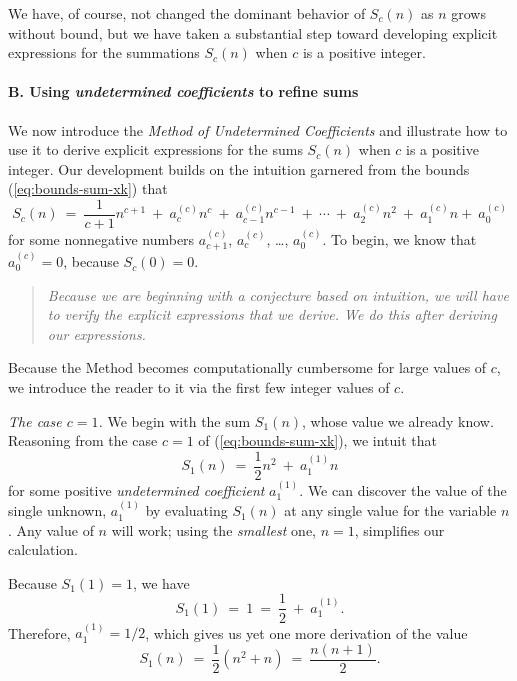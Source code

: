We have, of course, not changed the dominant behavior of $S_c(n)$ as
$n$ grows without bound, but we have taken a substantial step toward
developing explicit expressions for the summations $S_c(n)$ when $c$
is a positive integer.

\medskip

\paragraph{\small\sf B. Using {\em undetermined coefficients} to
  refine sums}

We now introduce the {\em Method of Undetermined Coefficients}
and illustrate how to use it to derive explicit expressions for the
sums $S_c(n)$ when $c$ is a positive integer.  Our development builds
on the intuition garnered from the bounds (\ref{eq:bounds-sum-xk})
that
\[ S_c(n) \ = \ \frac{1}{c+1} n^{c+1} \ + \ a^{(c)}_c n^c \ + \
a^{(c)}_{c-1} n^{c-1} \ + \ \cdots \ + \ a^{(c)}_2 n^2 \ + \ a^{(c)}_1 n
 + \ a^{(c)}_0
\]
for some nonnegative numbers  $a^{(c)}_{c+1}$, $a^{(c)}_c$, \ldots,
$a^{(c)}_0$.  To begin, we know that $a^{(c)}_0 = 0$, because $S_c(0)
= 0$.
\begin{quote}
{\em Because we are beginning with a conjecture based on intuition, we
  will have to verify the explicit expressions that we derive.  We do
  this after deriving our expressions.}
\end{quote}

Because the Method becomes computationally cumbersome for large values
of $c$, we introduce the reader to it via the first few integer values
of $c$.

{\it The case $c=1$.}
%
We begin with the sum $S_1(n)$, whose value we already know.
Reasoning from the case $c=1$ of (\ref{eq:bounds-sum-xk}), we intuit
that
\[ S_1(n) \ = \ \frac{1}{2} n^2 \ + \ a^{(1)}_1 n \]
for some positive {\it undetermined coefficient} $a^{(1)}_1$.  We can
discover the value of the single unknown, $a^{(1)}_1$ by evaluating
$S_1(n)$ at any single value for the variable $n$.  Any value of $n$
will work; using the {\em smallest} one, $n=1$, simplifies our
calculation.

Because $S_1(1) = 1$, we have
\[ S_1(1) \ = \ 1 \ = \ \frac{1}{2} \ + \ a^{(1)}_1. \]
Therefore, $a^{(1)}_1 = 1/2$, which gives us yet one more derivation
of the value
\[ S_1(n) \ = \ \frac{1}{2} \left( n^2 + n \right) \ = \ 
\frac{n(n+1)}{2}.
\]

\medskip

